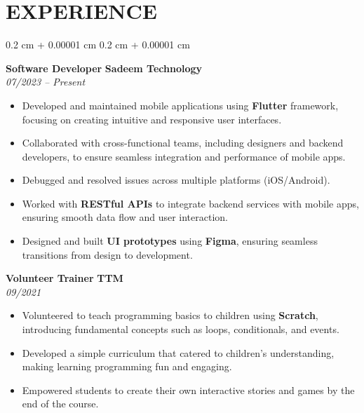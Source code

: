 \documentclass[10pt, letterpaper]{article}
\newenvironment{highlightsforbulletentries}{
    \begin{itemize}[
        topsep=0.10 cm,
        parsep=0.10 cm,
        partopsep=0pt,
        itemsep=0pt,
        leftmargin=10pt
    ]
}{
    \end{itemize}
} %
\newenvironment{onecolentry}{
    \begin{adjustwidth}{
        0.2 cm + 0.00001 cm
    }{
        0.2 cm + 0.00001 cm
    }
}{
    \end{adjustwidth}
} %
\begin{document}
        \vspace{0.2 cm}




    
    \section{EXPERIENCE}
        \vspace{0.2 cm}
    \begin{onecolentry}
        \begin{highlightsforbulletentries}


\noindent\textbf{Software Developer} \hfill \textbf{Sadeem Technology} \\
\textit{07/2023 – Present} \\
\begin{itemize}
    \item Developed and maintained mobile applications using \textbf{Flutter} framework, focusing on creating intuitive and responsive user interfaces.
    \item Collaborated with cross-functional teams, including designers and backend developers, to ensure seamless integration and performance of mobile apps.
    \item Debugged and resolved issues across multiple platforms (iOS/Android).
    \item Worked with \textbf{RESTful APIs} to integrate backend services with mobile apps, ensuring smooth data flow and user interaction.
 \item Designed and built \textbf{UI prototypes} using \textbf{Figma}, ensuring seamless transitions from design to development.
\end{itemize}
        \vspace{0.2 cm}
\noindent\textbf{Volunteer Trainer} \hfill \textbf{TTM} \\
\textit{09/2021} \\
\begin{itemize}
    \item Volunteered to teach programming basics to children using \textbf{Scratch}, introducing fundamental concepts such as loops, conditionals, and events.
    \item Developed a simple curriculum that catered to children’s understanding, making learning programming fun and engaging.
    \item Empowered students to create their own interactive stories and games by the end of the course.
\end{itemize}

\end{highlightsforbulletentries}
\end{onecolentry}
\end{document}

